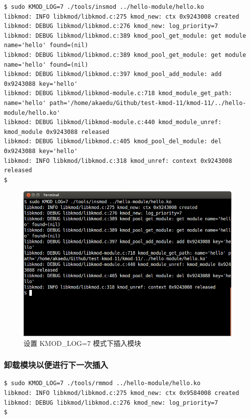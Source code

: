 \documentclass[11pt,a4paper]{article}
\makeatletter
\def\maxwidth{\ifdim\Gin@nat@width>\linewidth\linewidth
\else\Gin@nat@width\fi}
\let\Oldincludegraphics\includegraphics
\renewcommand{\includegraphics}[1]{\Oldincludegraphics[width=\maxwidth]{#1}}
\makeatother
\begin{document}
{\begin{shaded}\begin{verbatim}
$ sudo KMOD_LOG=7 ./tools/insmod ../hello-module/hello.ko
libkmod: INFO libkmod/libkmod.c:275 kmod_new: ctx 0x9243008 created
libkmod: DEBUG libkmod/libkmod.c:276 kmod_new: log_priority=7
libkmod: DEBUG libkmod/libkmod.c:389 kmod_pool_get_module: get module name='hello' found=(nil)
libkmod: DEBUG libkmod/libkmod.c:389 kmod_pool_get_module: get module name='hello' found=(nil)
libkmod: DEBUG libkmod/libkmod.c:397 kmod_pool_add_module: add 0x9243088 key='hello'
libkmod: DEBUG libkmod/libkmod-module.c:718 kmod_module_get_path: name='hello' path='/home/akaedu/Github/test-kmod-11/kmod-11/../hello-module/hello.ko'
libkmod: DEBUG libkmod/libkmod-module.c:440 kmod_module_unref: kmod_module 0x9243088 released
libkmod: DEBUG libkmod/libkmod.c:405 kmod_pool_del_module: del 0x9243088 key='hello'
libkmod: INFO libkmod/libkmod.c:318 kmod_unref: context 0x9243008 released
$ 
\end{verbatim}\end{shaded}}
\begin{figure}[htbp]
\centering
\includegraphics{./pictures/2-3-insmod.png}
\caption{设置 KMOD\_LOG=7 模式下插入模块}
\end{figure}

\subsubsection{卸载模块以便进行下一次插入}

{\begin{shaded}\begin{verbatim}
$ sudo KMOD_LOG=7 ./tools/rmmod ../hello-module/hello.ko
libkmod: INFO libkmod/libkmod.c:275 kmod_new: ctx 0x9584008 created
libkmod: DEBUG libkmod/libkmod.c:276 kmod_new: log_priority=7
$ 
\end{verbatim}\end{shaded}}
\end{document}
